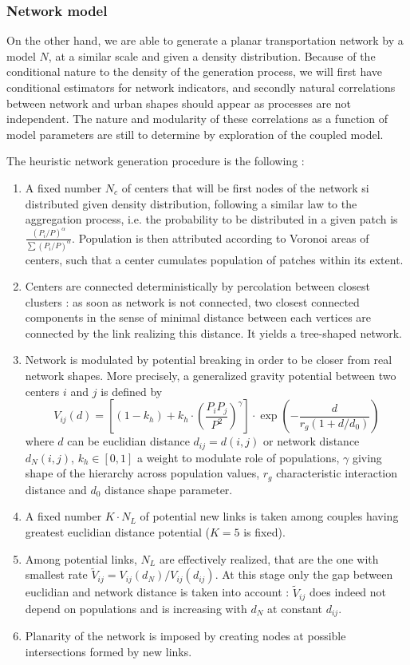 \documentclass{bmcart}
\begin{document}
\subsubsection*{Network model}


On the other hand, we are able to generate a planar transportation network by a model $N$, at a similar scale and given a density distribution. Because of the conditional nature to the density of the generation process, we will first have conditional estimators for network indicators, and secondly natural correlations between network and urban shapes should appear as processes are not independent. The nature and modularity of these correlations as a function of model parameters are still to determine by exploration of the coupled model.



The heuristic network generation procedure is the following :
\begin{enumerate}
\item A fixed number $N_c$ of centers that will be first nodes of the network si distributed given density distribution, following a similar law to the aggregation process, i.e. the probability to be distributed in a given patch is $\frac{(P_i/P)^{\alpha}}{\sum (P_i/P)^{\alpha}}$. Population is then attributed according to Voronoi areas of centers, such that a center cumulates population of patches within its extent.
\item Centers are connected deterministically by percolation between closest clusters : as soon as network is not connected, two closest connected components in the sense of minimal distance between each vertices are connected by the link realizing this distance. It yields a tree-shaped network.
\item Network is modulated by potential breaking in order to be closer from real network shapes. More precisely, a generalized gravity potential between two centers $i$ and $j$ is defined by
\[
V_{ij}(d) = \left[ (1 - k_h) + k_h \cdot \left( \frac{P_i P_j}{P^2} \right)^{\gamma} \right]\cdot \exp{\left( -\frac{d}{r_g (1 + d/d_0)} \right)}
\]
where $d$ can be euclidian distance $d_{ij}=d(i,j)$ or network distance $d_N(i,j)$, $k_h \in [0,1]$ a weight to modulate role of populations, $\gamma$ giving shape of the hierarchy across population values, $r_g$ characteristic interaction distance and $d_0$ distance shape parameter.
\item A fixed number $K\cdot N_L$ of potential new links is taken among couples having greatest euclidian distance potential ($K=5$ is fixed).
\item Among potential links, $N_L$ are effectively realized, that are the one with smallest rate $\tilde{V}_{ij} = V_{ij}(d_N)/V_{ij}(d_{ij})$. At this stage only the gap between euclidian and network distance is taken into account : $\tilde{V}_{ij}$ does indeed not depend on populations and is increasing with $d_N$ at constant $d_{ij}$.
\item Planarity of the network is imposed by creating nodes at possible intersections formed by new links.
\end{enumerate}
\end{document}
